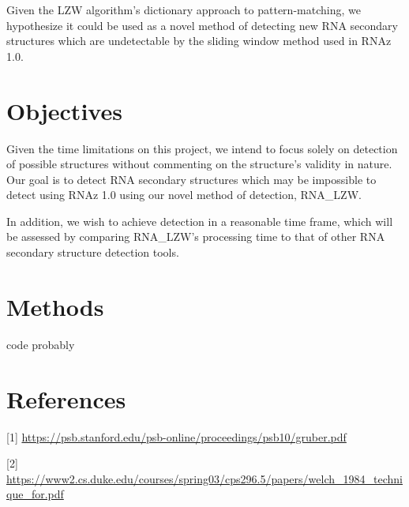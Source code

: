 \documentclass[letterpaper, 12pt]{artikel3}
\begin{document}
Given the LZW algorithm's dictionary approach to pattern-matching, we hypothesize it could be used as a novel method of detecting new RNA secondary structures which are undetectable by the sliding window method used in RNAz 1.0. 
\section*{Objectives}
Given the time limitations on this project, we intend to focus solely on detection of possible structures without commenting on the structure's validity in nature.  Our goal is to detect RNA secondary structures which may be impossible to detect using RNAz 1.0 using our novel method of detection, RNA\_LZW. 

In addition, we wish to achieve detection in a reasonable time frame, which will be assessed by comparing RNA\_LZW's processing time to that of other RNA secondary structure detection tools. 
\section*{Methods}

code probably

\section*{References}

[1] \url{https://psb.stanford.edu/psb-online/proceedings/psb10/gruber.pdf}

[2] \url{https://www2.cs.duke.edu/courses/spring03/cps296.5/papers/welch_1984_technique_for.pdf}
\end{document}
